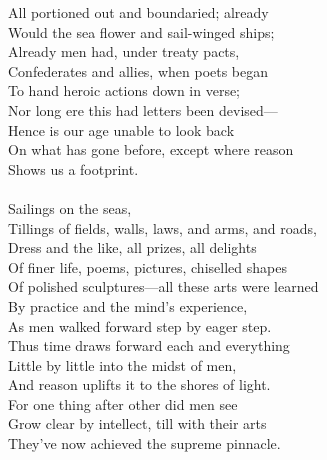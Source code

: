 All portioned out and boundaried; already\\
Would the sea flower and sail-winged ships;\\
Already men had, under treaty pacts,\\
Confederates and allies, when poets began\\
To hand heroic actions down in verse;\\
Nor long ere this had letters been devised—\\
Hence is our age unable to look back\\
On what has gone before, except where reason\\
Shows us a footprint.\\
\\
Sailings on the seas,\\
Tillings of fields, walls, laws, and arms, and roads,\\
Dress and the like, all prizes, all delights\\
Of finer life, poems, pictures, chiselled shapes\\
Of polished sculptures—all these arts were learned\\
By practice and the mind's experience,\\
As men walked forward step by eager step.\\
Thus time draws forward each and everything\\
Little by little into the midst of men,\\
And reason uplifts it to the shores of light.\\
For one thing after other did men see\\
Grow clear by intellect, till with their arts\\
They've now achieved the supreme pinnacle.



